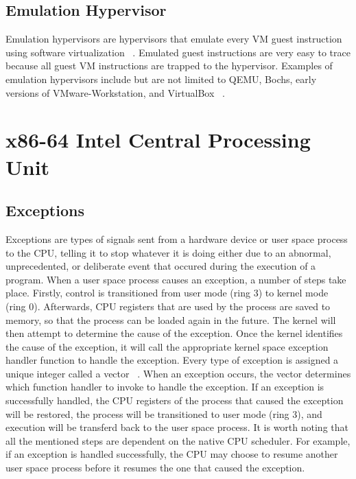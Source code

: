 \documentclass{report}
\begin{document}
\begin{spacing}{1.5}
\subsection{Emulation Hypervisor}
{\large
Emulation hypervisors are hypervisors that emulate every VM guest instruction using software virtualization ~\cite{10.1145/2775111}. Emulated guest instructions are very easy to trace because all guest VM instructions are trapped to the hypervisor. Examples of emulation hypervisors include but are not limited to QEMU, Bochs, early versions of VMware-Workstation, and VirtualBox ~\cite{10.1145/2775111}.
\newline
}










\section{x86-64 Intel Central Processing Unit}


\subsection{Exceptions}
{\large
Exceptions are types of signals sent from a hardware device or user space process to the CPU, telling it to stop whatever it is doing either due to an abnormal, unprecedented, or deliberate event that occured during the execution of a program. When a user space process causes an exception, a number of steps take place. Firstly, control is transitioned from user mode (ring 3) to kernel mode (ring 0). Afterwards, CPU registers that are used by the process are saved to memory, so that the process can be loaded again in the future. The kernel will then attempt to determine the cause of the exception. Once the kernel identifies the cause of the exception, it will call the appropriate kernel space exception handler function to handle the exception. Every type of exception is assigned a unique integer called a vector ~\cite{mitOperatingSystemEngineering}. When an exception occurs, the vector determines which function handler to invoke to handle the exception. If an exception is successfully handled, the CPU registers of the process that caused the exception will be restored, the process will be transitioned to user mode (ring 3), and execution will be transferd back to the user space process. It is worth noting that all the mentioned steps are dependent on the native CPU scheduler. For example, if an exception is handled successfully, the CPU may choose to resume another user space process before it resumes the one that caused the exception.
\newline
}


\end{spacing}
\end{document}
